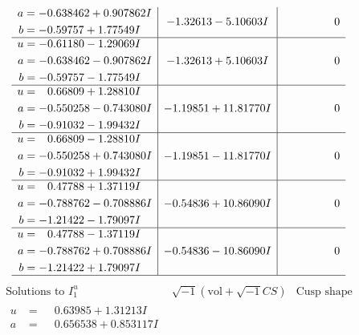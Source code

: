 \documentclass[1p]{elsarticle_modified}
\theoremstyle{definition}
\newcommand{\I}{\sqrt{-1}}
\begin{document}
$$\begin{array}{c|c|c}
\begin{aligned}
a &= -0.638462 + 0.907862 I \\
b &= -0.59757 + 1.77549 I\end{aligned}
 & -1.32613 - 5.10603 I & \phantom{-0.000000 } 0 \\ \hline\begin{aligned}
u &= -0.61180 - 1.29069 I \\
a &= -0.638462 - 0.907862 I \\
b &= -0.59757 - 1.77549 I\end{aligned}
 & -1.32613 + 5.10603 I & \phantom{-0.000000 } 0 \\ \hline\begin{aligned}
u &= \phantom{-}0.66809 + 1.28810 I \\
a &= -0.550258 - 0.743080 I \\
b &= -0.91032 - 1.99432 I\end{aligned}
 & -1.19851 + 11.81770 I & \phantom{-0.000000 } 0 \\ \hline\begin{aligned}
u &= \phantom{-}0.66809 - 1.28810 I \\
a &= -0.550258 + 0.743080 I \\
b &= -0.91032 + 1.99432 I\end{aligned}
 & -1.19851 - 11.81770 I & \phantom{-0.000000 } 0 \\ \hline\begin{aligned}
u &= \phantom{-}0.47788 + 1.37119 I \\
a &= -0.788762 - 0.708886 I \\
b &= -1.21422 - 1.79097 I\end{aligned}
 & -0.54836 + 10.86090 I & \phantom{-0.000000 } 0 \\ \hline\begin{aligned}
u &= \phantom{-}0.47788 - 1.37119 I \\
a &= -0.788762 + 0.708886 I \\
b &= -1.21422 + 1.79097 I\end{aligned}
 & -0.54836 - 10.86090 I & \phantom{-0.000000 } 0\\
 \hline 
 \end{array}$$\newpage$$\begin{array}{c|c|c}  
\text{Solutions to }I^u_{1}& \I (\text{vol} + \sqrt{-1}CS) & \text{Cusp shape}\\
 \hline 
\begin{aligned}
u &= \phantom{-}0.63985 + 1.31213 I \\
a &= \phantom{-}0.656538 + 0.853117 I \\

\end{aligned}
\end{array}$$
\end{document}
